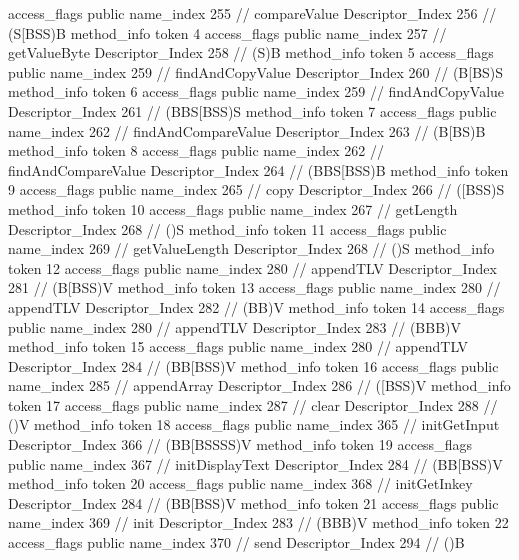 {{{{{					access_flags	public
					name_index	255		// compareValue
					Descriptor_Index	256		// (S[BSS)B
				}
				method_info {
					token	4
					access_flags	public
					name_index	257		// getValueByte
					Descriptor_Index	258		// (S)B
				}
				method_info {
					token	5
					access_flags	public
					name_index	259		// findAndCopyValue
					Descriptor_Index	260		// (B[BS)S
				}
				method_info {
					token	6
					access_flags	public
					name_index	259		// findAndCopyValue
					Descriptor_Index	261		// (BBS[BSS)S
				}
				method_info {
					token	7
					access_flags	public
					name_index	262		// findAndCompareValue
					Descriptor_Index	263		// (B[BS)B
				}
				method_info {
					token	8
					access_flags	public
					name_index	262		// findAndCompareValue
					Descriptor_Index	264		// (BBS[BSS)B
				}
				method_info {
					token	9
					access_flags	public
					name_index	265		// copy
					Descriptor_Index	266		// ([BSS)S
				}
				method_info {
					token	10
					access_flags	public
					name_index	267		// getLength
					Descriptor_Index	268		// ()S
				}
				method_info {
					token	11
					access_flags	public
					name_index	269		// getValueLength
					Descriptor_Index	268		// ()S
				}
				method_info {
					token	12
					access_flags	public
					name_index	280		// appendTLV
					Descriptor_Index	281		// (B[BSS)V
				}
				method_info {
					token	13
					access_flags	public
					name_index	280		// appendTLV
					Descriptor_Index	282		// (BB)V
				}
				method_info {
					token	14
					access_flags	public
					name_index	280		// appendTLV
					Descriptor_Index	283		// (BBB)V
				}
				method_info {
					token	15
					access_flags	public
					name_index	280		// appendTLV
					Descriptor_Index	284		// (BB[BSS)V
				}
				method_info {
					token	16
					access_flags	public
					name_index	285		// appendArray
					Descriptor_Index	286		// ([BSS)V
				}
				method_info {
					token	17
					access_flags	public
					name_index	287		// clear
					Descriptor_Index	288		// ()V
				}
				method_info {
					token	18
					access_flags	public
					name_index	365		// initGetInput
					Descriptor_Index	366		// (BB[BSSSS)V
				}
				method_info {
					token	19
					access_flags	public
					name_index	367		// initDisplayText
					Descriptor_Index	284		// (BB[BSS)V
				}
				method_info {
					token	20
					access_flags	public
					name_index	368		// initGetInkey
					Descriptor_Index	284		// (BB[BSS)V
				}
				method_info {
					token	21
					access_flags	public
					name_index	369		// init
					Descriptor_Index	283		// (BBB)V
				}
				method_info {
					token	22
					access_flags	public
					name_index	370		// send
					Descriptor_Index	294		// ()B
				}
			}
		}
	}
}
